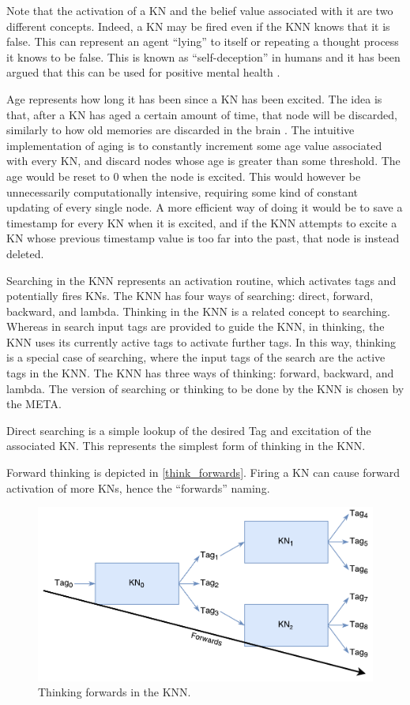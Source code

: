\documentclass[titlepage,11pt]{article}
\begin{document}
Note that the activation of a KN and the belief value associated with it are two different concepts. Indeed, a KN may be fired even if the KNN knows that it is false. This can represent an agent ``lying'' to itself or repeating a thought process it knows to be false. This is known as ``self-deception'' in humans and it has been argued that this can be used for positive mental health \cite{taylor1989positive}.

Age represents how long it has been since a KN has been excited. The idea is that, after a KN has aged a certain amount of time, that node will be discarded, similarly to how old memories are discarded in the brain \cite{aging}. The intuitive implementation of aging is to constantly increment some age value associated with every KN, and discard nodes whose age is greater than some threshold. The age would be reset to 0 when the node is excited. This would however be unnecessarily computationally intensive, requiring some kind of constant updating of every single node. A more efficient way of doing it would be to save a timestamp for every KN when it is excited, and if the KNN attempts to excite a KN whose previous timestamp value is too far into the past, that node is instead deleted.

Searching in the KNN represents an activation routine, which activates tags and potentially fires KNs. The KNN has four ways of searching: direct, forward, backward, and lambda. Thinking in the KNN is a related concept to searching. Whereas in search input tags are provided to guide the KNN, in thinking, the KNN uses its currently active tags to activate further tags. In this way, thinking is a special case of searching, where the input tags of the search are the active tags in the KNN. The KNN has three ways of thinking: forward, backward, and lambda. The version of searching or thinking to be done by the KNN is chosen by the META. 

Direct searching is a simple lookup of the desired Tag and excitation of the associated KN. This represents the simplest form of thinking in the KNN.

Forward thinking is depicted in \autoref{think_forwards}. Firing a KN can cause forward activation of more KNs, hence the ``forwards'' naming.

\begin{figure}[!htb]
	\includegraphics[width=\columnwidth]{figures/forwards_thinking.pdf}
	\caption{Thinking forwards in the KNN.}
	\label{think_forwards}
\end{figure}
\end{document}
